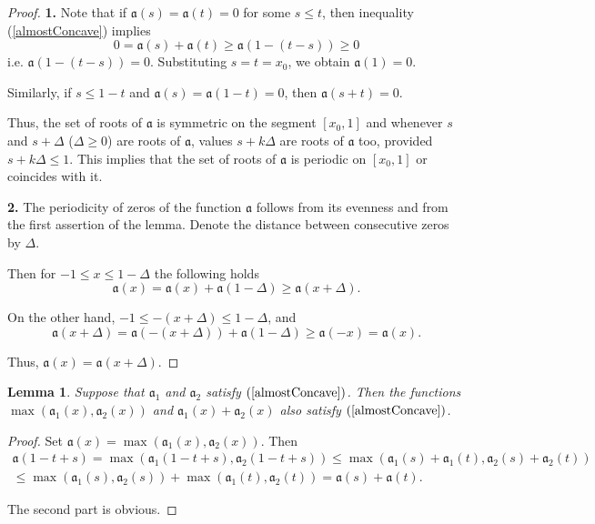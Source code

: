 \documentclass[12pt]{article}
\renewcommand{\ge}{\geqslant}
\renewcommand{\le}{\leqslant}
\newtheorem{lm}{Lemma}
\begin{document}
\begin{proof}
{\bf 1.}
Note that if $\mathfrak a(s) = \mathfrak a(t) = 0$ for some $s \le t$,
then inequality (\ref{almostConcave}) implies
$$0 = \mathfrak a(s) + \mathfrak a(t) \ge \mathfrak a( 1 - (t - s) ) \ge 0$$
i.e. $\mathfrak a(1 - (t - s)) = 0$.
Substituting $s = t = x_0$, we obtain $\mathfrak a(1) = 0$.

Similarly, if $s \le 1 - t$ and $\mathfrak a(s) = \mathfrak a(1 - t) = 0$, then $\mathfrak a(s + t) = 0$.

Thus, the set of roots of $\mathfrak a$ is symmetric on the segment $[x_0, 1]$ and
whenever $s$ and $s + \Delta$ ($\Delta \ge 0$) are roots of $\mathfrak a$,
values $s + k\Delta$ are roots of $\mathfrak a$ too, provided $s + k\Delta \le 1$.
This implies that the set of roots of $\mathfrak a$ is periodic on $[x_0, 1]$
or coincides with it.

{\bf 2.} The periodicity of zeros of the function $\mathfrak a$ follows from its evenness and from the first assertion of the lemma.
Denote the distance between consecutive zeros by $\Delta$.

Then for $-1 \le x \le 1 - \Delta$ the following holds
$$\mathfrak a(x) = \mathfrak a(x) + \mathfrak a(1 - \Delta) \ge \mathfrak a(x + \Delta).$$

On the other hand, $-1 \le -(x + \Delta) \le 1 - \Delta$, and
$$\mathfrak a(x + \Delta) = \mathfrak a(-(x + \Delta)) + \mathfrak a(1 - \Delta) \ge \mathfrak a(-x) = \mathfrak a(x).$$

Thus, $\mathfrak a(x) = \mathfrak a(x + \Delta)$.
\end{proof}

\begin{lm}
\label{maxSumConcave}
Suppose that $\mathfrak a_1$ and $\mathfrak a_2$ satisfy $(\ref{almostConcave})$.
Then the functions $\max (\mathfrak a_1(x), \mathfrak a_2(x))$ and $\mathfrak a_1(x) + \mathfrak a_2(x)$ also satisfy $(\ref{almostConcave})$.
\end{lm}
\begin{proof}
Set $\mathfrak a(x) = \max (\mathfrak a_1(x), \mathfrak a_2(x))$. Then
\begin{multline*}
\mathfrak a(1 - t + s) = \max(\mathfrak a_1( 1 - t + s), \mathfrak a_2(1 - t + s)) \le
\max(\mathfrak a_1(s) + \mathfrak a_1(t), \mathfrak a_2(s) + \mathfrak a_2(t)) \\
\le \max(\mathfrak a_1(s), \mathfrak a_2(s)) + \max(\mathfrak a_1(t), \mathfrak a_2(t)) =
\mathfrak a(s) + \mathfrak a(t).
\end{multline*}

The second part is obvious.
\end{proof}
\end{document}
